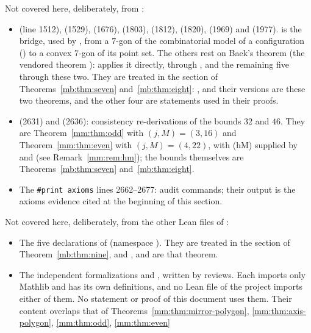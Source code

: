{Not covered here, deliberately, from :
\begin{itemize}
\item {} (line 1512),  (1529),  (1676),
   (1803),  (1812),  (1820),
   (1969) and  (1977).  is the
  bridge, used by , from a $7$-gon of the combinatorial model of a configuration
  () to a convex $7$-gon of its point set. The others rest on Baek's theorem (the
  vendored theorem ):  applies it directly,  through
  , and the remaining five through these two. They are treated in the section
  of Theorems~\ref{mb:thm:seven} and~\ref{mb:thm:eight}: ,  and
  their  versions are these two theorems, and the other four are statements used in their
  proofs.
\item {} (2631) and  (2636): consistency re-derivations of the bounds
  $32$ and $46$. They are Theorem~\ref{mm:thm:odd} with $(j,M)=(3,16)$ and Theorem~\ref{mm:thm:even} with
  $(j,M)=(4,22)$, with (hM) supplied by  and  (see
  Remark~\ref{mm:rem:hm}); the bounds themselves are Theorems~\ref{mb:thm:seven}
  and~\ref{mb:thm:eight}.
\item The \texttt{\#print axioms} lines 2662--2677: audit commands; their output is the axioms evidence
  cited at the beginning of this section.
\end{itemize}
Not covered here, deliberately, from the other Lean files of :
\begin{itemize}
\item The five declarations of  (namespace
  ). They are treated in the section of Theorem~\ref{mb:thm:nine}, and
  ,  and  are that theorem.
\item The independent formalizations  and
  , written by reviews. Each imports only Mathlib and has its own
  definitions, and no Lean file of the project imports either of them. No statement or proof of this
  document uses them. Their content overlaps that of
  Theorems~\ref{mm:thm:mirror-polygon}, \ref{mm:thm:axis-polygon}, \ref{mm:thm:odd}, \ref{mm:thm:even}

\end{itemize}}
